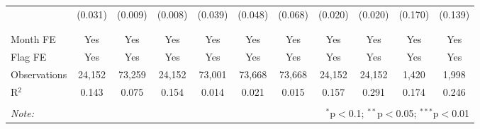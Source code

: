 \begin{table}[H]
\begin{tabular}{@{\extracolsep{1pt}}lcccccccccc}
  & (0.031) & (0.009) & (0.008) & (0.039) & (0.048) & (0.068) & (0.020) & (0.020) & (0.170) & (0.139) \\ 
  & & & & & & & & & & \\ 
\hline \\[-1.8ex] 
Month FE & Yes & Yes & Yes & Yes & Yes & Yes & Yes & Yes & Yes & Yes \\ 
Flag FE & Yes & Yes & Yes & Yes & Yes & Yes & Yes & Yes & Yes & Yes \\ 
Observations & 24,152 & 73,259 & 24,152 & 73,001 & 73,668 & 73,668 & 24,152 & 24,152 & 1,420 & 1,998 \\ 
R$^{2}$ & 0.143 & 0.075 & 0.154 & 0.014 & 0.021 & 0.015 & 0.157 & 0.291 & 0.174 & 0.246 \\ 
\hline 
\hline \\[-1.8ex] 
\textit{Note:}  & \multicolumn{10}{r}{$^{*}$p$<$0.1; $^{**}$p$<$0.05; $^{***}$p$<$0.01} \\ 
\end{tabular} 
\end{table} 
